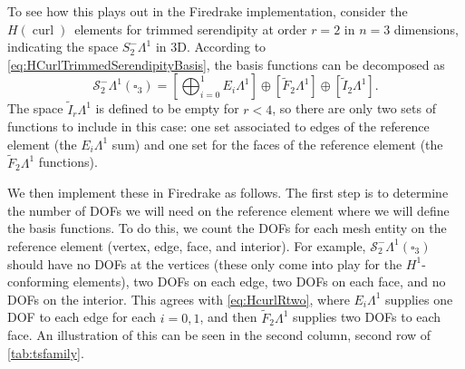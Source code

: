\documentclass[format=acmsmall,screen,timestamp=false,a4paper]{acmart}
\DeclareMathOperator{\curl}{curl}
\newcommand\josh[1]{\textbf{\textcolor[rgb]{0,.5,1}{[Josh: #1]}}}
\newcommand\lm[1]{\textbf{\textcolor[rgb]{1,0,0.5}{[Lawrence: #1]}}}
\newcommand{\calS}{\mathcal{S}}
\newcommand{\hcurl}{\ensuremath{{H}(\curl)}\xspace}
\begin{document}
 
To see how this plays out in the Firedrake implementation, consider the \hcurl~elements for trimmed serendipity at order $r=2$ in $n=3$ dimensions, indicating the space $S_2^- \Lambda^1$ in 3D. According to \cref{eq:HCurlTrimmedSerendipityBasis}, the basis functions can be decomposed as
\begin{equation}\label{eq:HcurlRtwo}
   \calS^-_2\Lambda^1(\square_3) =    \left[\bigoplus_{i=0}^{1} E_i \Lambda^1\right] \oplus \left[\tilde{F}_2 \Lambda^1\right]\oplus \left[\tilde{I}_2 \Lambda^1\right].
   \end{equation}
The space $\tilde{I}_r \Lambda^1$ is defined to be empty for $r<4$, so there are only two sets of functions to include in this case: one set associated to edges of the reference element (the $E_i\Lambda^1$ sum) and one set for the faces of the reference element (the $\tilde{F}_2\Lambda^1$ functions).

We then implement these in Firedrake as follows.  The first step is to determine the number of DOFs we will need on the reference element where we will define the basis functions.  To do this, we count the DOFs for each mesh entity on the reference element (vertex, edge, face, and interior).  For example, $\mathcal{S}_2^- \Lambda^1(\square_3)$ should have no DOFs at the vertices (these only come into play for the $H^1$-conforming elements), two DOFs on each edge, two DOFs on each face, and no DOFs on the interior.  This agrees with \cref{eq:HcurlRtwo}, where $E_i\Lambda^1$ supplies one DOF to each edge for each $i=0, 1$, and then $\tilde{F}_2\Lambda^1$ supplies two DOFs to each face.  An illustration of this can be seen in the second column, second row of \cref{tab:tsfamily}.
\end{document}
